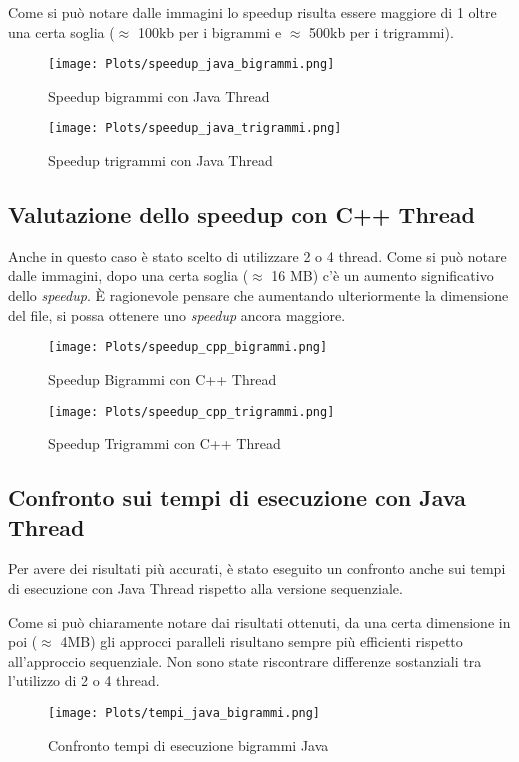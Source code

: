 \documentclass[10pt,twocolumn,letterpaper]{article}
\begin{document}
Come si può notare dalle immagini lo speedup risulta essere maggiore di 1 oltre una certa soglia ($\approx$ 100kb per i bigrammi e  $\approx$ 500kb per i trigrammi).

\begin{figure}[h]
\texttt{[image: Plots/speedup\_java\_bigrammi.png]}
\caption{Speedup bigrammi con Java Thread}
\end{figure}

\begin{figure}[h]
\texttt{[image: Plots/speedup\_java\_trigrammi.png]}
\caption{Speedup trigrammi con Java Thread}
\end{figure}

\newpage
\subsection{Valutazione dello speedup con C++ Thread}
Anche in questo caso è stato scelto di utilizzare 2 o 4 thread.
Come si può notare dalle immagini, dopo una certa soglia ($\approx$ 16 MB) c'è un aumento significativo dello \textit{speedup}. È ragionevole pensare che aumentando ulteriormente la dimensione del file, si possa ottenere uno \textit{speedup} ancora maggiore.

\begin{figure}[h]
\texttt{[image: Plots/speedup\_cpp\_bigrammi.png]}
\caption{Speedup Bigrammi con C++ Thread}
\end{figure}

\begin{figure}[h]
\texttt{[image: Plots/speedup\_cpp\_trigrammi.png]}
\caption{Speedup Trigrammi con C++ Thread}
\end{figure}
\newpage

\newpage
\subsection{Confronto sui tempi di esecuzione con Java Thread}
Per avere dei risultati più accurati, è stato eseguito un confronto anche sui tempi di esecuzione con Java Thread rispetto alla versione sequenziale.

Come si può chiaramente notare dai risultati ottenuti, da una certa dimensione in poi ($\approx$ 4MB) gli approcci paralleli risultano sempre più efficienti rispetto all'approccio sequenziale. Non sono state riscontrare differenze sostanziali tra l'utilizzo di 2 o 4 thread.
\begin{figure}[h]
\texttt{[image: Plots/tempi\_java\_bigrammi.png]}
\caption{Confronto tempi di esecuzione bigrammi Java}
\end{figure}
\end{document}
